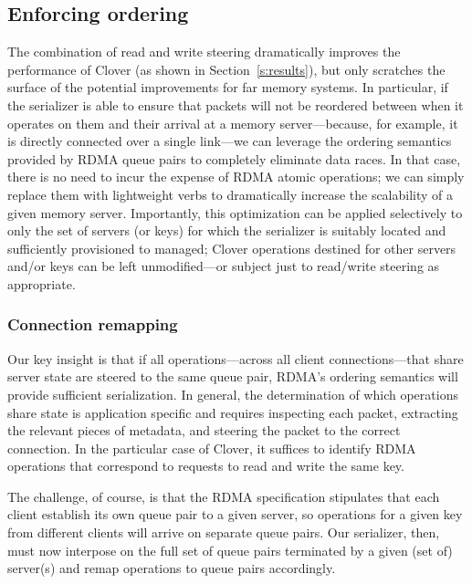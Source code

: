 \subsection{Enforcing ordering}

The combination of read and write steering dramatically improves the
performance of Clover (as shown in Section~\ref{s:results}), but only
scratches the surface of the potential improvements for far memory
systems.  In particular, if the serializer is able to ensure that
packets will not be reordered between when it operates on them and
their arrival at a memory server---because, for example, it is
directly connected over a single link---we can leverage the ordering
semantics provided by RDMA queue pairs to completely eliminate data
races.  In that case, there is no need to incur the expense of RDMA
atomic operations; we can simply replace them with lightweight verbs
to dramatically increase the scalability of a given memory server.
Importantly, this optimization can be applied selectively to only the
set of servers (or keys) for which the serializer is suitably located
and sufficiently provisioned to managed; Clover operations destined
for other servers and/or keys can be left unmodified---or subject just
to read/write steering as appropriate.

\subsubsection{Connection remapping}

Our key insight is that if all operations---across all client
connections---that share server state are steered to the same queue
pair, RDMA's ordering semantics will provide sufficient serialization.
In general, the determination of which operations share state is
application specific and requires inspecting each packet, extracting
the relevant pieces of metadata, and steering the packet to the
correct connection.  In the particular case of Clover, it suffices to
identify RDMA operations that correspond to requests to read and write
the same key.


The challenge, of course, is that the RDMA specification stipulates
that each client establish its own queue pair to a given server, so
operations for a given key from different clients will arrive on
separate queue pairs.  Our serializer, then, must now interpose on the
full set of queue pairs terminated by a given (set of) server(s) and
remap operations to queue pairs accordingly.

